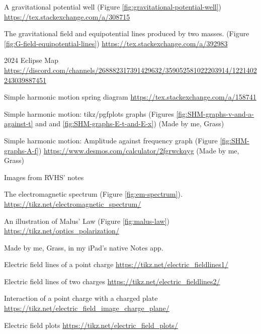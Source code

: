 \documentclass[oneside]{book}
\begin{document}
\begin{enumerate}[label={[\arabic*]}]
    \item\label{source:gravitational-potential-well} A gravitational potential well (Figure \ref{fig:gravitational-potential-well}) \url{https://tex.stackexchange.com/a/308715}
    \item\label{source:G-field-equipotential-lines} The gravitational field and equipotential lines produced by two masses. (Figure \ref{fig:G-field-equipotential-lines}) \url{https://tex.stackexchange.com/a/392983}
    \item\label{2024 Eclipse Map} 2024 Eclipse Map \url{https://discord.com/channels/268882317391429632/359052581022203914/1221402243039887451}
    \item\label{Simple harmonic motion} Simple harmonic motion spring diagram \url{https://tex.stackexchange.com/a/158741}
    \item\label{Simple harmonic motion graphs} Simple harmonic motion: tikz/pgfplots graphs (Figures \ref{fig:SHM-graphs-v-and-a-against-t} and and \ref{fig:SHM-graphs-E-t-and-E-x}) (Made by me, Grass)
    \item\label{Simple harmonic motion amplitude-vs-frequency graph} Simple harmonic motion: Amplitude against frequency graph (Figure \ref{fig:SHM-graphs-A-f}) \url{https://www.desmos.com/calculator/2fgrwckqyg} (Made by me, Grass)
    \item\label{RVHS} Images from RVHS' notes
    \item\label{source:em-spectrum} The electromagnetic spectrum (Figure \ref{fig:em-spectrum}). \url{https://tikz.net/electromagnetic_spectrum/}
    \item\label{source:malus-law} An illustration of Malus' Law (Figure \ref{fig:malus-law}) \url{https://tikz.net/optics_polarization/} 
    \item\label{Me} Made by me, Grass, in my iPad's native Notes app.
    \item\label{Electric field lines of a point charge} Electric field lines of a point charge \url{https://tikz.net/electric_fieldlines1/}
    \item\label{Electric field lines of two charges} Electric field lines of two charges \url{https://tikz.net/electric_fieldlines2/}
    \item\label{Interaction of a point charge with a charged plate} Interaction of a point charge with a charged plate \url{https://tikz.net/electric_field_image_charge_plane/}
    \item\label{Electric field plots} Electric field plots \url{https://tikz.net/electric_field_plots/}

\end{enumerate}
\end{document}
